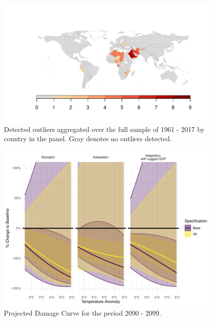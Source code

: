 \documentclass[11pt, letterpaper]{article}
\numberwithin{algorithm}{section}
\numberwithin{assumption}{section}
\numberwithin{lemma}{section}
\numberwithin{theorem}{section}
\numberwithin{corollary}{section}
\numberwithin{remark}{section}
\numberwithin{equation}{section}
\numberwithin{figure}{section}
\numberwithin{table}{section}
\begin{document}
\begin{figure}[!htbp]  \vspace{-.35in}
\centering
\includegraphics[width = \textwidth]{ctry_map_adapt.pdf}
\caption{Detected outliers aggregated over the full sample of 1961 - 2017 by country in the panel. Gray denotes no outliers detected. }
\label{fig_map_app1}
\end{figure}


\begin{figure}[!htbp]  \vspace{-.35in}
\centering
\includegraphics[width = \textwidth]{projections.pdf}
\caption{Projected Damage Curve for the period 2090 - 2099.}
\label{fig_projection}
\end{figure}


\clearpage
\end{document}
